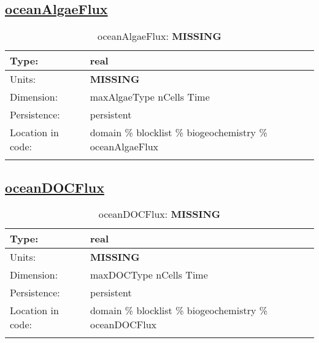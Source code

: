 \subsection[oceanAlgaeFlux]{\hyperref[sec:var_tab_biogeochemistry]{oceanAlgaeFlux}}
\label{subsec:var_sec_biogeochemistry_oceanAlgaeFlux}
\begin{center}
\begin{longtable}{| p{2.0in} | p{4.0in} |}
        \hline 
        Type: & real \\
        \hline 
        Units: & {\bf \color{red} MISSING} \\
        \hline 
        Dimension: & maxAlgaeType nCells Time \\
        \hline 
        Persistence: & persistent \\
        \hline 
         Location in code: & domain \% blocklist \% biogeochemistry \% oceanAlgaeFlux \\
         \hline 
    \caption{oceanAlgaeFlux: {\bf \color{red} MISSING}}
\end{longtable}
\end{center}
\subsection[oceanDOCFlux]{\hyperref[sec:var_tab_biogeochemistry]{oceanDOCFlux}}
\label{subsec:var_sec_biogeochemistry_oceanDOCFlux}
\begin{center}
\begin{longtable}{| p{2.0in} | p{4.0in} |}
        \hline 
        Type: & real \\
        \hline 
        Units: & {\bf \color{red} MISSING} \\
        \hline 
        Dimension: & maxDOCType nCells Time \\
        \hline 
        Persistence: & persistent \\
        \hline 
         Location in code: & domain \% blocklist \% biogeochemistry \% oceanDOCFlux \\
         \hline 
    \caption{oceanDOCFlux: {\bf \color{red} MISSING}}
\end{longtable}
\end{center}
